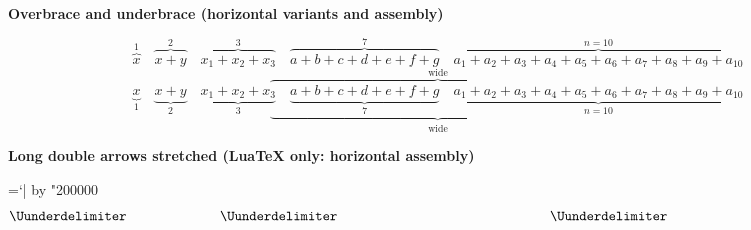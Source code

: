 \documentclass[11pt]{article}
\begin{document}
\textbf{Overbrace and underbrace (horizontal variants and assembly)}\par
\[ \overbrace{x}^{1}\quad \overbrace{x+y}^{2}\quad \overbrace{x_1+x_2+x_3}^{3}\quad
   \overbrace{a+b+c+d+e+f+g}^{7}\quad
   \overbrace{a_1+a_2+a_3+a_4+a_5+a_6+a_7+a_8+a_9+a_{10}}^{n=10} \]
\[ \overbrace{\qquad\qquad\qquad\qquad\qquad\qquad\qquad\qquad\qquad\qquad\qquad\qquad}^{\text{wide}} \]
\[ \underbrace{x}_{1}\quad \underbrace{x+y}_{2}\quad \underbrace{x_1+x_2+x_3}_{3}\quad
   \underbrace{a+b+c+d+e+f+g}_{7}\quad
   \underbrace{a_1+a_2+a_3+a_4+a_5+a_6+a_7+a_8+a_9+a_{10}}_{n=10} \]
\[ \underbrace{\qquad\qquad\qquad\qquad\qquad\qquad\qquad\qquad\qquad\qquad\qquad\qquad}_{\text{wide}} \]

\ifdefined\directlua
\textbf{Long double arrows stretched (LuaTeX only: horizontal assembly)}\par
{}=\Udelcodenum`| \divide{} by "200000
\[ \Uunderdelimiter\count255 "27F9 {\hbox to 2cm{}}\quad
   \Uunderdelimiter\count255 "27F9 {\hbox to 5cm{}}\quad
   \Uunderdelimiter\count255 "27F8 {\hbox to 5cm{}} \]
\fi
\end{document}

